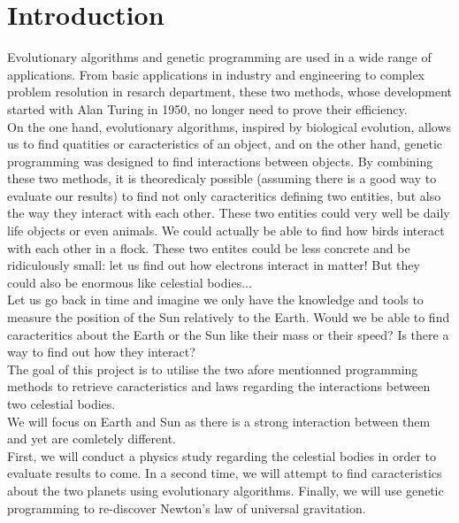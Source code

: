 \section{Introduction}
Evolutionary algorithms and genetic programming are used in a wide range of
applications. From basic applications in industry and engineering to complex
problem resolution in resarch department, these two methods, whose development
started with Alan Turing in 1950, no longer need to prove their efficiency.\\


On the one hand, evolutionary algorithms, inspired by biological evolution,
allows us to find quatities or caracteristics of an object, and on the other
hand, genetic programming was designed to find interactions between objects. By
combining these two methods, it is theoredicaly possible (assuming there is a
good way to evaluate our results) to find not only caracteritics defining two
entities, but also the way they interact with each other.
These two entities could very well be daily life objects or even animals. We
could actually be able to find how birds interact with each other in a flock.
These two entites could be less concrete and be ridiculously small: let us find
out how electrons interact in matter! But they could also be enormous like
celestial bodies...\\

Let us go back in time and imagine we only have the knowledge and tools to
measure the position of the Sun relatively to the Earth. Would we be able to
find caracteritics about the Earth or the Sun like their mass or their speed?
Is there a way to find out how they interact?\\

The goal of this project is to utilise the two afore mentionned programming
methods to retrieve caracteristics and laws regarding the interactions between
two celestial bodies.\\
We will focus on Earth and Sun as there is a strong interaction between them
and yet are comletely different.\\
First, we will conduct a physics study regarding the celestial bodies in order
to evaluate results to come.
In a second time, we will attempt to find caracteristics about the two planets using
evolutionary algorithms. Finally, we will use genetic programming to
re-discover Newton's law
of universal gravitation.


